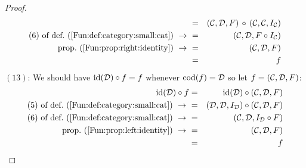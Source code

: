 \begin{proof}
\begin{eqnarray*}
            &=&(\Cat,\Dat,F)\,\circ\,(\Cat,\Cat,I_{\cal C})\\
            \mbox{$(6)$ of def.~(\ref{Fun:def:category:small:cat})}\ \to\ 
            &=&(\Cat,\Dat,F\circ I_{\cal C})\\
            \mbox{prop.~(\ref{Fun:prop:right:identity})}\ \to\ 
            &=&(\Cat,\Dat,F)\\
            &=&f
        \end{eqnarray*}
    $(13)$: We should have $\mbox{\rm id}(\mbox{$\cal D$})\circ f=f$ whenever $\mbox{\rm cod}(f)=\mbox{$\cal D$}$
    so let $f=(\mbox{$\cal C$},\mbox{$\cal D$},F)$:
        \begin{eqnarray*}\id(\Dat)\circ f
            &=&\id(\Dat)\circ(\Cat,\Dat,F)\\
            \mbox{$(5)$ of def.~(\ref{Fun:def:category:small:cat})}\ \to\ 
            &=&(\Dat,\Dat,I_{\cal D})\circ(\Cat,\Dat,F)\\
            \mbox{$(6)$ of def.~(\ref{Fun:def:category:small:cat})}\ \to\ 
            &=&(\Cat,\Dat,I_{\cal D}\circ F)\\
            \mbox{prop.~(\ref{Fun:prop:left:identity})}\ \to\ 
            &=&(\Cat,\Dat,F)\\
            &=&f
        \end{eqnarray*}
\end{proof}


